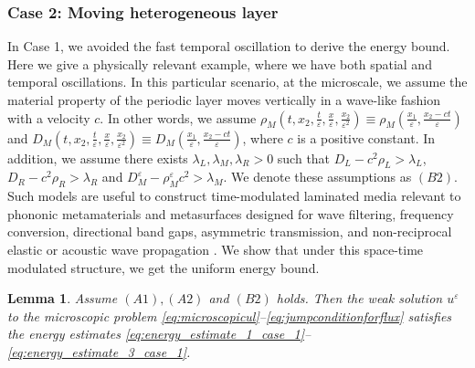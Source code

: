 \documentclass[11pt]{article}
\newtheorem{lemma}{Lemma}
\def\es{\varepsilon}
\begin{document}
\subsubsection{Case 2: Moving heterogeneous layer }
In Case 1, we avoided the fast temporal oscillation to derive the energy bound. Here we give a physically relevant example, where we have both spatial and temporal oscillations. In this particular scenario, at the microscale, we assume the material property of the periodic layer moves vertically in a wave-like fashion with a velocity $c$. In other words, we assume $\rho_M\left(t,x_2,\frac{t}{\es},\frac{x}{\es},\frac{x_2}{\es^2}\right)\equiv \rho_M\left(\frac{x_1}{\es},\frac{x_2-ct}{\es}\right)$ and $D_M\left(t,x_2,\frac{t}{\es},\frac{x}{\es},\frac{x_2}{\es^2}\right)\equiv D_M\left(\frac{x_1}{\es},\frac{x_2-ct}{\es}\right)$, where $c$ is a positive constant. In addition, we assume  there exists $\lambda_L,\lambda_M,\lambda_R>0$ such that $D_{L}-c^2\rho_{L}>\lambda_L$, $D_{R}-c^2\rho_{R}>\lambda_R$ and $D_M^\es-\rho_M^\es c^2>\lambda_M$.
We denote these assumptions as $(B2)$.  Such models are useful to construct time-modulated laminated media relevant to phononic metamaterials and metasurfaces designed for wave filtering, frequency conversion, directional band gaps, asymmetric transmission, and non-reciprocal elastic or acoustic wave propagation \cite{Nassar2017Modulated}. We show that under this space-time modulated structure, we get the uniform energy bound.
\begin{lemma}
	   Assume $(A1),(A2)$ and $(B2)$ holds. Then the weak solution $u^\es$ to the microscopic problem \eqref{eq:microscopicul}--\eqref{eq:jumpconditionforflux} satisfies the energy estimates \eqref{eq:energy_estimate_1_case_1}--\eqref{eq:energy_estimate_3_case_1}.
	\end{lemma}
\end{document}
